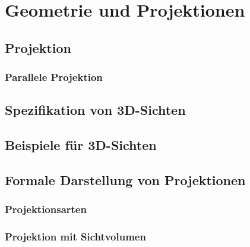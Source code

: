 \chapter{Geometrie und Projektionen}

\section{Projektion}
\subsection{Parallele Projektion}

\section{Spezifikation von 3D-Sichten}

\section{Beispiele für 3D-Sichten}

\section{Formale Darstellung von Projektionen}
\subsection{Projektionsarten}
\subsection{Projektion mit Sichtvolumen}


